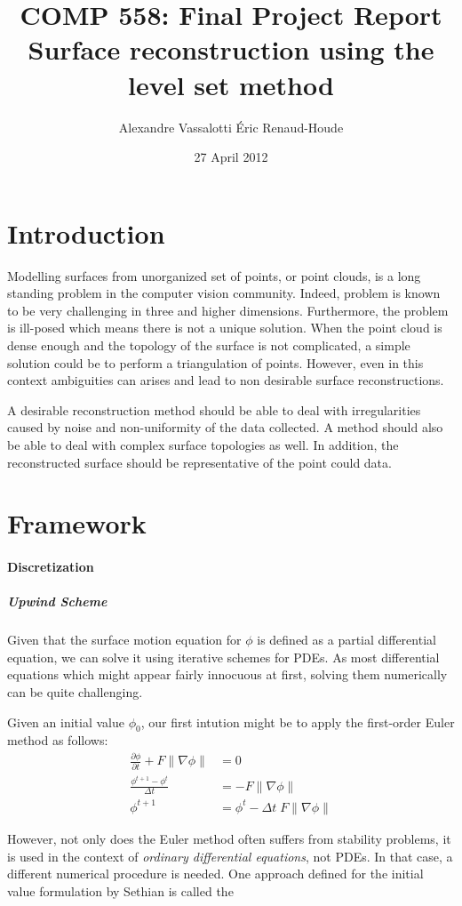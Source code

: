 \documentclass{article}
\author{Alexandre Vassalotti \quad \'{E}ric Renaud-Houde}
\title{COMP 558: Final Project Report \\
  \large \textbf{Surface reconstruction using the level set method}
}
\date{27 April 2012}
\begin{document}
\maketitle
\section{Introduction}
Modelling surfaces from unorganized set of points, or point clouds, is a long
standing problem in the computer vision community. Indeed, problem is known to
be very challenging in three and higher dimensions. Furthermore, the problem
is ill-posed which means there is not a unique solution. When the point cloud
is dense enough and the topology of the surface is not complicated, a simple
solution could be to perform a triangulation of points. However, even in this
context ambiguities can arises and lead to non desirable surface
reconstructions.

A desirable reconstruction method should be able to deal with irregularities
caused by noise and non-uniformity of the data collected. A method should also
be able to deal with complex surface topologies as well. In addition, the
reconstructed surface should be representative of the point could data.



\section{Framework}

\paragraph{Discretization}
\subparagraph{Upwind Scheme}

Given that the surface motion equation \cite{moler2003nineteen} for $\phi$ is
defined as a partial differential equation, we can solve it using iterative
schemes for PDEs. As most differential equations which might appear fairly
innocuous at first, solving them numerically can be quite challenging.

Given an initial value $\phi_0$, our first intution might be to apply the
first-order Euler method as follows:
\begin{align}
  \frac{\partial \phi}{\partial t} + F \|\nabla \phi\| &= 0 \\
  \frac{\phi^{t+1} - \phi^{t}}{\Delta t} &=  -F \|\nabla \phi\| \\
  \phi^{t+1} &= \phi^{t} - \Delta t \; F \|\nabla \phi\| 
\end{align}

However, not only does the Euler method often suffers from stability problems,
it is used in the context of \textit{ordinary differential equations}, not
PDEs. In that case, a different numerical procedure is needed.  One approach
defined for the initial value formulation by Sethian is called the



\end{document}
